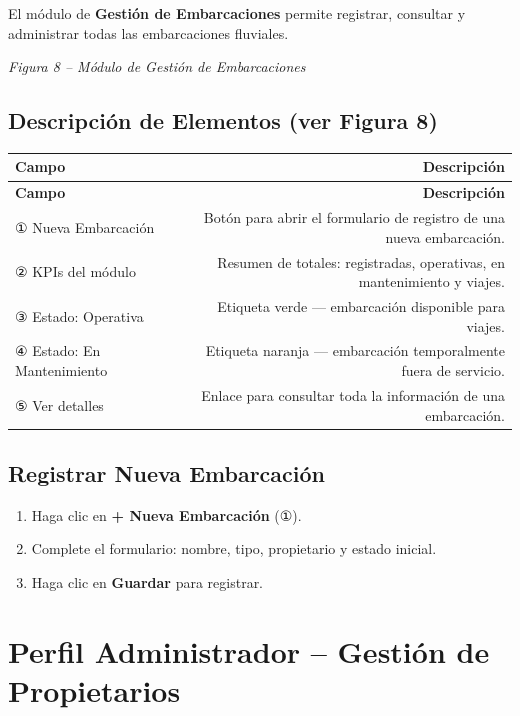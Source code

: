\documentclass[12pt,a4paper]{article}
\begin{document}
El módulo de \textbf{Gestión de Embarcaciones} permite registrar, consultar y administrar todas las embarcaciones fluviales.

\textit{Figura 8 -- Módulo de Gestión de Embarcaciones}

\subsection{Descripción de Elementos (ver Figura 8)}

\begin{longtable}{LR}
  \toprule
  \textbf{Campo} & \textbf{Descripción} \\
  \midrule
  \endfirsthead
  \toprule
  \textbf{Campo} & \textbf{Descripción} \\
  \midrule
  \endhead
  \bottomrule
  \endfoot
  ① Nueva Embarcación      & Botón para abrir el formulario de registro de una nueva embarcación. \\[4pt]
  ② KPIs del módulo        & Resumen de totales: registradas, operativas, en mantenimiento y viajes. \\[4pt]
  ③ Estado: Operativa      & Etiqueta verde --- embarcación disponible para viajes. \\[4pt]
  ④ Estado: En Mantenimiento & Etiqueta naranja --- embarcación temporalmente fuera de servicio. \\[4pt]
  ⑤ Ver detalles           & Enlace para consultar toda la información de una embarcación. \\
\end{longtable}

\subsection{Registrar Nueva Embarcación}

\begin{enumerate}[leftmargin=1.5em]
  \item Haga clic en \textbf{+ Nueva Embarcación} (①).
  \item Complete el formulario: nombre, tipo, propietario y estado inicial.
  \item Haga clic en \textbf{Guardar} para registrar.
\end{enumerate}

\section{Perfil Administrador -- Gestión de Propietarios}
\end{document}

